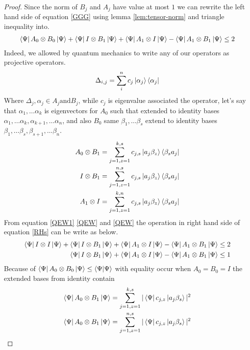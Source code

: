 \begin{proof}

Since the norm of $B_j$ and $A_j$  have value  at most $1$ we can rewrite the left hand side of equation  \ref{GGG} using lemma \ref{lem:tensor-norm}  and triangle inequality into. 
\begin{align}\label{RHs}
 \bra{\Psi}A_0\otimes B_0\ket{\Psi}+ \bra{\Psi} I\otimes B_1\ket{\Psi}+ \bra{\Psi}A_1\otimes I\ket{\Psi}-  \bra{\Psi}A_1\otimes B_1 \ket{\Psi} \leq 2
\end{align}
 Indeed, we allowed by quantum mechanics to  write any of our operators as projective operators. 
$$\Delta_{i,j}=\sum_{i}^{n}c_j \ket{\alpha_j}\bra{\alpha_j}$$
Where $\Delta_{j},\alpha_j \in A_j \text{and} B_j$, while $c_j$ is eigenvalue associated the operator, let's say that  $\alpha_1,\dots \alpha_k$ is eigenvectors for $A_0$ such that extended to identity bases $\alpha_1,\dots \alpha_k,\alpha_{k+1},\dots \alpha_{n}$,
and also  $B_0$ same $\beta_1,\dots \beta_s$ extend to identity bases $\beta_1,\dots \beta_s,\beta_{s+1},\dots \beta_n$. 
\begin{align}
A_0 \otimes B_1=\sum_{j=1,z=1}^{k,s}c_{j,s}\ket{a_j\beta _z} \bra{\beta_s a_j }\label{QEW}\\
I \otimes B_1=\sum_{j=1,z=1}^{n,s}c_{j,s}\ket{a_j\beta _z} \bra{\beta_s a_j }\label{QEW1}\\
A_1 \otimes I=\sum_{j=1,z=1}^{k,n}c_{j,s}\ket{a_j\beta _z} \bra{\beta_s a_j }\label{QEW2}
\end{align}
From equation \ref{QEW1}  \ref{QEW} and \ref{QEW} the operation in right hand  side of  equation  \ref{RHs} can be write as below.
\begin{align}\label{NAND:TINEQ}
\bra{\Psi} I\otimes I\ket{\Psi}+\bra{\Psi}I\otimes B_1\ket{\Psi}+\bra{\Psi}A_1\otimes I\ket{\Psi}-\bra{\Psi}A_1\otimes B_1 \ket{\Psi} \leq 2\\
\bra{\Psi}I\otimes B_1\ket{\Psi}+\bra{\Psi}A_1\otimes I\ket{\Psi}-\bra{\Psi}A_1\otimes B_1 \ket{\Psi} \leq 1
\end{align}
Because of $\bra{\Psi} A_0\otimes B_0\ket{\Psi} \leq \bra {\Psi} \ket{\Psi}$ with equality occur when $A_0=B_0=I$ the extended bases from identity contain  
\begin{align*}
\bra{\Psi} A_0\otimes B_1\ket{\Psi}=\sum_{j=1,z=1}^{k,s}|\bra{\Psi}c_{j,z}\ket{a_j\beta _s}|^2\\
\bra{\Psi} A_0\otimes B_1\ket{\Psi}=\sum_{j=1,z=1}^{n,s}|\bra{\Psi}c_{j,z}\ket{a_j\beta _s}|^2
\end{align*}


\end{proof}

